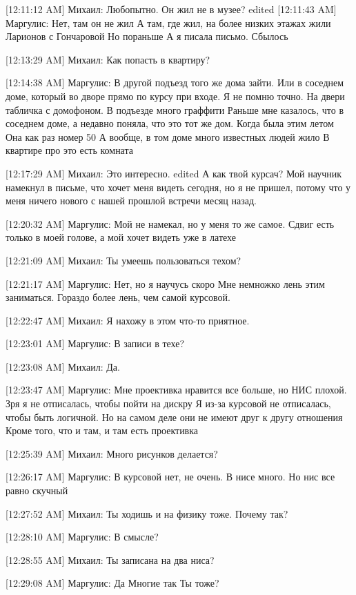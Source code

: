 \documentclass{article}
\begin{document}
[12:11:12 AM] Михаил:
Любопытно.
 Он жил не в музее?
edited 
[12:11:43 AM] Маргулис:
Нет, там он не жил
 А там, где жил, на более низких этажах жили Ларионов с Гончаровой
 Но пораньше
 А я писала письмо. Сбылось

[12:13:29 AM] Михаил:
Как попасть в квартиру?

[12:14:38 AM] Маргулис:
В другой подъезд того же дома зайти. Или в соседнем доме, который во дворе прямо по курсу при входе. Я не помню точно. На двери табличка с домофоном. В подъезде много граффити
 Раньше мне казалось, что в соседнем доме, а недавно поняла, что это тот же дом.
 Когда была этим летом
 Она как раз номер 50
 А вообще, в том доме много известных людей жило
 В квартире про это есть комната

[12:17:29 AM] Михаил:
Это интересно.
edited 
А как твой курсач? Мой научник намекнул в письме, что хочет меня видеть сегодня, но я не пришел, потому что у меня ничего нового с нашей прошлой встречи месяц назад.

[12:20:32 AM] Маргулис:
Мой не намекал, но у меня то же самое. Сдвиг есть только в моей голове, а мой хочет видеть уже в латехе

[12:21:09 AM] Михаил:
Ты умеешь пользоваться техом?

[12:21:17 AM] Маргулис:
Нет, но я научусь скоро
 Мне немножко лень этим заниматься. Гораздо более лень, чем самой курсовой.

[12:22:47 AM] Михаил:
Я нахожу в этом что-то приятное.

[12:23:01 AM] Маргулис:
В записи в техе?

[12:23:08 AM] Михаил:
Да.

[12:23:47 AM] Маргулис:
Мне проективка нравится все больше, но НИС плохой. Зря я не отписалась, чтобы пойти на дискру
 Я из-за курсовой не отписалась, чтобы быть логичной.
 Но на самом деле они не имеют друг к другу отношения
 Кроме того, что и там, и там есть проективка

[12:25:39 AM] Михаил:
Много рисунков делается?

[12:26:17 AM] Маргулис:
В курсовой нет, не очень. В нисе много. Но нис все равно скучный

[12:27:52 AM] Михаил:
Ты ходишь и на физику тоже. Почему так?

[12:28:10 AM] Маргулис:
В смысле?

[12:28:55 AM] Михаил:
Ты записана на два ниса?

[12:29:08 AM] Маргулис:
Да
 Многие так
 Ты тоже?
\end{document}
